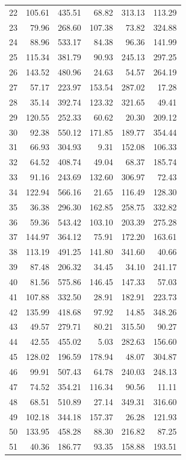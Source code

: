 \begin{longtable}{rrrrrr}
22 & 105.61 & 435.51 & 68.82 & 313.13 & 113.29 \\
23 & 79.96 & 268.60 & 107.38 & 73.82 & 324.88 \\
24 & 88.96 & 533.17 & 84.38 & 96.36 & 141.99 \\
25 & 115.34 & 381.79 & 90.93 & 245.13 & 297.25 \\
26 & 143.52 & 480.96 & 24.63 & 54.57 & 264.19 \\
27 & 57.17 & 223.97 & 153.54 & 287.02 & 17.28 \\
28 & 35.14 & 392.74 & 123.32 & 321.65 & 49.41 \\
29 & 120.55 & 252.33 & 60.62 & 20.30 & 209.12 \\
30 & 92.38 & 550.12 & 171.85 & 189.77 & 354.44 \\
31 & 66.93 & 304.93 & 9.31 & 152.08 & 106.33 \\
32 & 64.52 & 408.74 & 49.04 & 68.37 & 185.74 \\
33 & 91.16 & 243.69 & 132.60 & 306.97 & 72.43 \\
34 & 122.94 & 566.16 & 21.65 & 116.49 & 128.30 \\
35 & 36.38 & 296.30 & 162.85 & 258.75 & 332.82 \\
36 & 59.36 & 543.42 & 103.10 & 203.39 & 275.28 \\
37 & 144.97 & 364.12 & 75.91 & 172.20 & 163.61 \\
38 & 113.19 & 491.25 & 141.80 & 341.60 & 40.66 \\
39 & 87.48 & 206.32 & 34.45 & 34.10 & 241.17 \\
40 & 81.56 & 575.86 & 146.45 & 147.33 & 57.03 \\
41 & 107.88 & 332.50 & 28.91 & 182.91 & 223.73 \\
42 & 135.99 & 418.68 & 97.92 & 14.85 & 348.26 \\
43 & 49.57 & 279.71 & 80.21 & 315.50 & 90.27 \\
44 & 42.55 & 455.02 & 5.03 & 282.63 & 156.60 \\
45 & 128.02 & 196.59 & 178.94 & 48.07 & 304.87 \\
46 & 99.91 & 507.43 & 64.78 & 240.03 & 248.13 \\
47 & 74.52 & 354.21 & 116.34 & 90.56 & 11.11 \\
48 & 68.51 & 510.89 & 27.14 & 349.31 & 316.60 \\
49 & 102.18 & 344.18 & 157.37 & 26.28 & 121.93 \\
50 & 133.95 & 458.28 & 88.30 & 216.82 & 87.25 \\
51 & 40.36 & 186.77 & 93.35 & 158.88 & 193.51 \\

\end{longtable}
